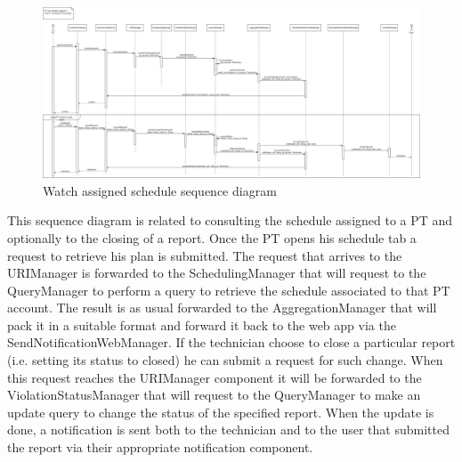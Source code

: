\begin{figure}[H]
  \centering
  \includegraphics[width=1\textwidth]{Images/UML_diagrams/Sequence_Diagrams/Watch_schedule_sd.png}
  \caption{Watch assigned schedule sequence diagram}
  \label{fig:watch_schedule_sd}
\end{figure}
This sequence diagram is related to consulting the schedule assigned to a PT and optionally to the closing of a report. Once the PT opens his schedule tab a request to retrieve his plan is submitted. The request that arrives to the URIManager is forwarded to the SchedulingManager that will request to the QueryManager to perform a query to retrieve the schedule associated to that PT account. The result is as usual forwarded to the AggregationManager that will pack it in a suitable format and forward it back to the web app via the SendNotificationWebManager. If the technician choose to close a particular report (i.e. setting its status to closed) he can submit a request for such change. When this request reaches the URIManager component it will be forwarded to the ViolationStatusManager that will request to the QueryManager to make an update query to change the status of the specified report. When the update is done, a notification is sent both to the technician and to the user that submitted the report via their appropriate notification component. 
